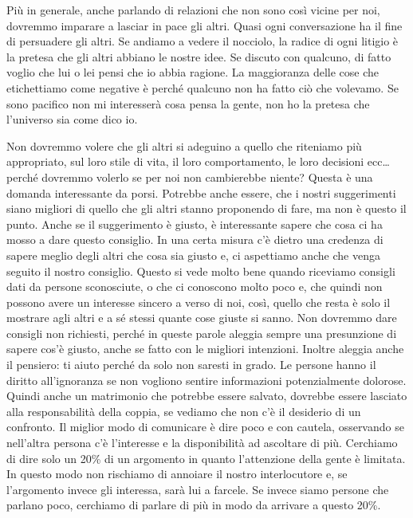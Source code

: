 \documentclass[12pt]{book} %
\begin{document}
Più in generale, anche parlando di relazioni che non sono così vicine per noi, dovremmo imparare a lasciar in pace gli
altri. Quasi ogni conversazione ha il fine di persuadere gli altri. Se andiamo a vedere il nocciolo, la radice di ogni litigio è la pretesa che gli altri abbiano le nostre idee.
Se discuto con qualcuno, di fatto voglio che lui o lei pensi che io abbia ragione.
La maggioranza delle cose che etichettiamo come negative è perché qualcuno non ha fatto ciò che volevamo. Se sono pacifico non mi interesserà cosa pensa la gente, non ho la pretesa che l'universo sia come dico io.

Non dovremmo volere che gli altri si adeguino a quello che
riteniamo più appropriato, sul loro stile di vita, il loro comportamento, le loro decisioni ecc… perché dovremmo
volerlo se per noi non cambierebbe niente? Questa è una domanda interessante da porsi. Potrebbe anche essere, che i
nostri suggerimenti siano migliori di quello che gli altri stanno proponendo di fare, ma non è questo il punto. Anche
se il suggerimento è giusto, è interessante sapere che cosa ci ha mosso a dare questo consiglio. In una certa misura
c'è dietro una credenza di sapere meglio degli altri che cosa sia giusto e, ci aspettiamo anche
che venga seguito il nostro consiglio. Questo si vede molto bene quando riceviamo consigli dati da persone sconosciute, 
o che ci conoscono molto poco e, che quindi non possono avere un
interesse sincero a verso di noi, così, quello che resta è solo il mostrare agli altri e a sé stessi quante cose
giuste si sanno. Non dovremmo dare consigli non richiesti, perché in queste parole aleggia sempre una presunzione di
sapere cos'è giusto, anche se fatto con le migliori intenzioni. Inoltre aleggia anche il pensiero:
ti aiuto perché da solo non saresti in grado.
Le persone hanno il diritto all'ignoranza se non vogliono sentire informazioni potenzialmente
dolorose. Quindi anche un matrimonio che potrebbe essere salvato, dovrebbe essere lasciato alla responsabilità della
coppia, se vediamo che non c'è il desiderio di un confronto. Il miglior modo di comunicare è dire
poco e con cautela, osservando se nell'altra persona c'è l'interesse e la disponibilità ad ascoltare di più.
Cerchiamo di dire solo un 20\% di un argomento in quanto l'attenzione della gente è limitata. In questo modo non rischiamo di annoiare il nostro interlocutore e, se l'argomento invece gli interessa, sarà lui a farcele. Se invece siamo persone che parlano poco, cerchiamo di parlare di più in modo da arrivare a questo 20\%.
\end{document}
